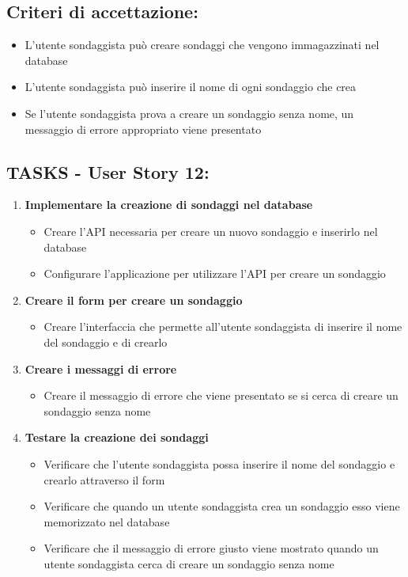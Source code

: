     \subsection*{Criteri di accettazione:}  
    \begin{itemize}  
        \item L'utente sondaggista può creare sondaggi che vengono immagazzinati nel database
        \item L'utente sondaggista può inserire il nome di ogni sondaggio che crea
        \item Se l'utente sondaggista prova a creare un sondaggio senza nome, un messaggio di errore appropriato viene presentato
    \end{itemize}  
    \subsection*{TASKS - User Story 12:}  
    \begin{enumerate}  
        \item \textbf{Implementare la creazione di sondaggi nel database}  
            \begin{itemize}  
                \item Creare l'API necessaria per creare un nuovo sondaggio e inserirlo nel database
                \item Configurare l'applicazione per utilizzare l'API per creare un sondaggio
            \end{itemize} 
        \item \textbf{Creare il form per creare un sondaggio}  
            \begin{itemize}  
                \item Creare l'interfaccia che permette all'utente sondaggista di inserire il nome del sondaggio e di crearlo
            \end{itemize} 
        \item \textbf{Creare i messaggi di errore}  
            \begin{itemize}  
                \item Creare il messaggio di errore che viene presentato se si cerca di creare un sondaggio senza nome
            \end{itemize} 
        \item \textbf{Testare la creazione dei sondaggi}  
            \begin{itemize}  
                \item Verificare che l'utente sondaggista possa inserire il nome del sondaggio e crearlo attraverso il form
                \item Verificare che quando un utente sondaggista crea un sondaggio esso viene memorizzato nel database
                \item Verificare che il messaggio di errore giusto viene mostrato quando un utente sondaggista cerca di creare un sondaggio senza nome
            \end{itemize} 
    \end{enumerate}
